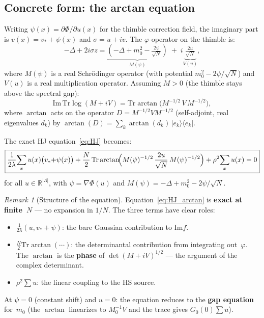 \documentclass[12pt]{article}
\theoremstyle{definition}
\theoremstyle{remark}
\newtheorem{remark}[theorem]{Remark}
\newcommand{\R}{\mathbb{R}}
\newcommand{\Tr}{\mathrm{Tr}}
\newcommand{\ph}{\varphi}
\newcommand{\La}{\Lambda}
\newcommand{\im}{\mathrm{Im}}
\begin{document}
\subsection{Concrete form: the arctan equation}

Writing $\psi(x) = \partial\Phi/\partial u(x)$ for the thimble
correction field, the imaginary part is $v(x) = v_* + \psi(x)$
and $\sigma = u + iv$. The $\ph$-operator on the thimble is:
\begin{equation}
  -\Delta + 2i\sigma z
    = \underbrace{(-\Delta + m_0^2 - \tfrac{2\psi}{\sqrt{N}})}_{M(\psi)}
    \;+\; i\underbrace{\tfrac{2u}{\sqrt{N}}}_{V(u)},
\end{equation}
where $M(\psi)$ is a real Schr\"odinger operator (with potential
$m_0^2 - 2\psi/\sqrt{N}$) and $V(u)$ is a real multiplication operator.
Assuming $M > 0$ (the thimble stays above the spectral gap):
\begin{equation}
  \im\,\Tr\log(M + iV) = \Tr\arctan\bigl(M^{-1/2}\,V\,M^{-1/2}\bigr),
\end{equation}
where $\arctan$ acts on the operator $D = M^{-1/2}VM^{-1/2}$
(self-adjoint, real eigenvalues $d_k$) by
$\arctan(D) = \sum_k \arctan(d_k)\,|e_k\rangle\langle e_k|$.

The exact HJ equation~\eqref{eq:HJ} becomes:
\begin{equation}\label{eq:HJ_arctan}
  \boxed{\frac{1}{2\lambda}\!\sum_x u(x)\bigl(v_*{+}\psi(x)\bigr)
    + \frac{N}{2}\,\Tr\arctan\!\Bigl(
      M(\psi)^{-1/2}\,\frac{2u}{\sqrt{N}}\,M(\psi)^{-1/2}\Bigr)
    + \rho^2\!\sum_x u(x) = 0}
\end{equation}
for all $u \in \R^{|\La|}$, with $\psi = \nabla\Phi(u)$ and
$M(\psi) = -\Delta + m_0^2 - 2\psi/\sqrt{N}$.

\begin{remark}[Structure of the equation]
Equation~\eqref{eq:HJ_arctan} is \textbf{exact at finite~$N$} ---
no expansion in $1/N$. The three terms have clear roles:
\begin{itemize}
\item $\frac{1}{2\lambda}(u,v_*{+}\psi)$: the bare Gaussian
  contribution to $\im f$.
\item $\frac{N}{2}\Tr\arctan(\cdots)$: the determinantal
  contribution from integrating out~$\ph$. The $\arctan$ is the
  \textbf{phase} of $\det(M+iV)^{1/2}$ --- the argument of
  the complex determinant.
\item $\rho^2\sum u$: the linear coupling to the HS source.
\end{itemize}
At $\psi = 0$ (constant shift) and $u = 0$: the equation reduces to
the \textbf{gap equation} for~$m_0$ (the $\arctan$ linearizes to
$M_0^{-1}V$ and the trace gives $G_0(0)\sum u$).
\end{remark}
\end{document}
